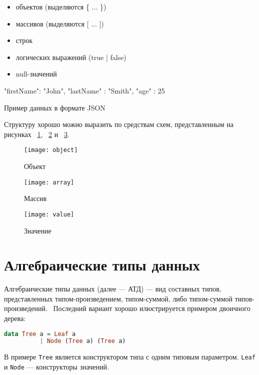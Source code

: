 \begin{itemize}
  \item объектов (выделяются \{ ... \})
  \item массивов (выделяются [ ... ])
  \item строк
  \item логических выражений (true | false)
  \item null-значений
\end{itemize}

\begin{ListingEnv}[H]
\begin{Verb}
{     
    "firstName": "John",
    "lastName" : "Smith",
    "age" : 25
}
\end{Verb}
\caption{Пример данных в формате JSON}
\label{listing:jsonExample}
\end{ListingEnv}

Структуру хорошо можно выразить по средствам схем, представленным на рисунках ~\ref{fig:objectGr}, ~\ref{fig:arrayGr} и ~\ref{fig:valueGr}.

\begin{figure}[!ht]
\centering
\texttt{[image: object]}
\caption{\label{fig:objectGr}Объект}
\end{figure}

\begin{figure}[!ht]
\centering
\texttt{[image: array]}
\caption{\label{fig:arrayGr}Массив}
\end{figure}

\begin{figure}[!ht]
\centering
\texttt{[image: value]}
\caption{\label{fig:valueGr}Значение}
\end{figure}

\section{Алгебраические типы данных}

Алгебраические типы данных (далее --- АТД) --- вид составных типов, представленных типом-произведением, типом-суммой, либо типом-суммой типов-произведений.~\cite{haskellGreatGood} Последний вариант хорошо илюстрируется примером двоичного дерева:

\begin{lstlisting}[language=Haskell]
data Tree a = Leaf a
          | Node (Tree a) (Tree a)
\end{lstlisting}

В примере \lstinline{Tree} является конструктором типа с одним типовым параметром. \lstinline{Leaf} и \lstinline{Node} --- конструкторы значений. 

